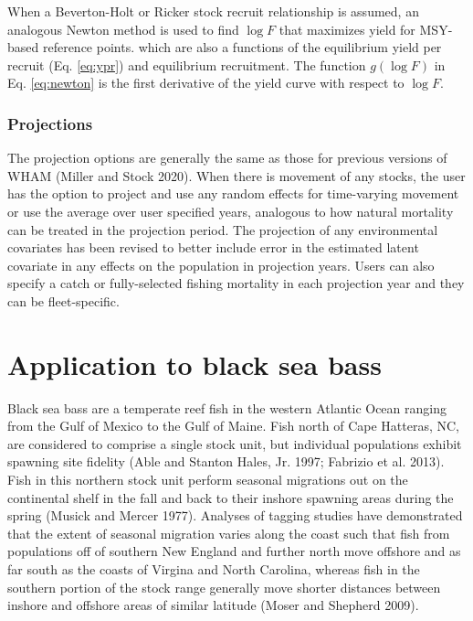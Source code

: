 \documentclass[
]{article}
\begin{document}
When a Beverton-Holt or Ricker stock recruit relationship is assumed, an
analogous Newton method is used to find \(\log F\) that maximizes yield
for MSY-based reference points. which are also a functions of the
equilibrium yield per recruit (Eq. \ref{eq:ypr}) and equilibrium
recruitment. The function \(g(\log F)\) in Eq. \ref{eq:newton} is the
first derivative of the yield curve with respect to \(\log F\).

\hypertarget{projections}{%
\subsubsection*{Projections}\label{projections}}

The projection options are generally the same as those for previous
versions of WHAM (Miller and Stock 2020). When there is movement of any
stocks, the user has the option to project and use any random effects
for time-varying movement or use the average over user specified years,
analogous to how natural mortality can be treated in the projection
period. The projection of any environmental covariates has been revised
to better include error in the estimated latent covariate in any effects
on the population in projection years. Users can also specify a catch or
fully-selected fishing mortality in each projection year and they can be
fleet-specific.

\hypertarget{application-to-black-sea-bass}{%
\section*{Application to black sea
bass}\label{application-to-black-sea-bass}}

Black sea bass are a temperate reef fish in the western Atlantic Ocean
ranging from the Gulf of Mexico to the Gulf of Maine. Fish north of Cape
Hatteras, NC, are considered to comprise a single stock unit, but
individual populations exhibit spawning site fidelity (Able and Stanton
Hales, Jr. 1997; Fabrizio et al. 2013). Fish in this northern stock unit
perform seasonal migrations out on the continental shelf in the fall and
back to their inshore spawning areas during the spring (Musick and
Mercer 1977). Analyses of tagging studies have demonstrated that the
extent of seasonal migration varies along the coast such that fish from
populations off of southern New England and further north move offshore
and as far south as the coasts of Virgina and North Carolina, whereas
fish in the southern portion of the stock range generally move shorter
distances between inshore and offshore areas of similar latitude (Moser
and Shepherd 2009).
\end{document}
